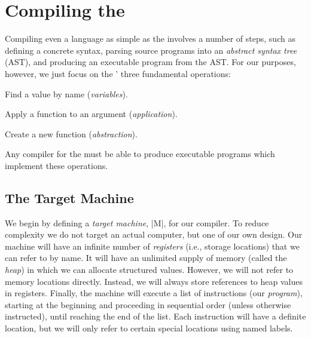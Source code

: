 \documentclass[12pt]{report}
\begin{document}

\section{Compiling the \LamA}

Compiling even a language as simple as the \lamA involves a number of
steps, such as defining a concrete syntax, parsing source programs
into an \emph{abstract syntax tree} (AST), and producing an executable
program from the AST. For our purposes, however, we just focus on the
\lamA' three fundamental operations:
\begin{description}
\item Find a value by name (\emph{variables}).
\item Apply a function to an argument (\emph{application}).
\item Create a new function (\emph{abstraction}). 
\end{description}
Any compiler for the \lamA must be able to produce executable programs
which implement these operations. 

\subsection{The Target Machine}
We begin by defining a \emph{target machine}, |M|, for our compiler. To
reduce complexity we do not target an actual computer, but one of our
own design. Our machine will have an infinite number of
\emph{registers} (i.e., storage locations) that we can refer to by
name. It will have an unlimited supply of memory (called the
\emph{heap}) in which we can allocate structured values. However, we
will not refer to memory locations directly. Instead, we will always
store references to heap values in registers. Finally, the machine
will execute a list of instructions (our \emph{program}), starting at
the beginning and proceeding in sequential order (unless otherwise
instructed), until reaching the end of the list. Each instruction will
have a definite location, but we will only refer to certain special
locations using named labels.
\end{document}
